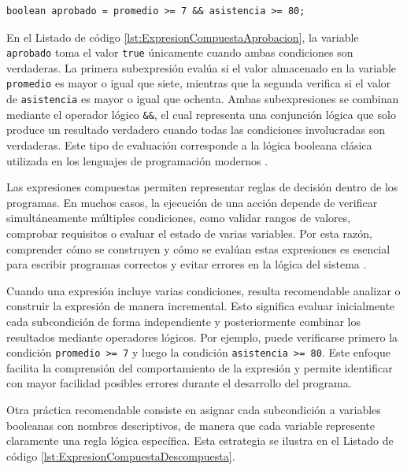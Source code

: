\documentclass[12pt,twoside]{book}
\begin{document}
						\begin{lstlisting}[style=Java,caption={Evaluación de una expresión compuesta mediante operadores lógicos.},label={lst:ExpresionCompuestaAprobacion}]
	boolean aprobado = promedio >= 7 && asistencia >= 80; \end{lstlisting}
						
						\noindent
						En el Listado de código \ref{lst:ExpresionCompuestaAprobacion}, la variable \texttt{aprobado} toma el valor \texttt{true} únicamente cuando ambas condiciones son verdaderas. La primera subexpresión evalúa si el valor almacenado en la variable \texttt{promedio} es mayor o igual que siete, mientras que la segunda verifica si el valor de \texttt{asistencia} es mayor o igual que ochenta. Ambas subexpresiones se combinan mediante el operador lógico \texttt{\&\&}, el cual representa una conjunción lógica que solo produce un resultado verdadero cuando todas las condiciones involucradas son verdaderas. Este tipo de evaluación corresponde a la lógica booleana clásica utilizada en los lenguajes de programación modernos \cite{Sebesta2018Concepts}.
						
						Las expresiones compuestas permiten representar reglas de decisión dentro de los programas. En muchos casos, la ejecución de una acción depende de verificar simultáneamente múltiples condiciones, como validar rangos de valores, comprobar requisitos o evaluar el estado de varias variables. Por esta razón, comprender cómo se construyen y cómo se evalúan estas expresiones es esencial para escribir programas correctos y evitar errores en la lógica del sistema \cite{Pressman2019Software,Sommerville2015Software}.
						
						Cuando una expresión incluye varias condiciones, resulta recomendable analizar o construir la expresión de manera incremental. Esto significa evaluar inicialmente cada subcondición de forma independiente y posteriormente combinar los resultados mediante operadores lógicos. Por ejemplo, puede verificarse primero la condición \texttt{promedio >= 7} y luego la condición \texttt{asistencia >= 80}. Este enfoque facilita la comprensión del comportamiento de la expresión y permite identificar con mayor facilidad posibles errores durante el desarrollo del programa.
						
						Otra práctica recomendable consiste en asignar cada subcondición a variables booleanas con nombres descriptivos, de manera que cada variable represente claramente una regla lógica específica. Esta estrategia se ilustra en el Listado de código \ref{lst:ExpresionCompuestaDescompuesta}.
						
\end{document}
